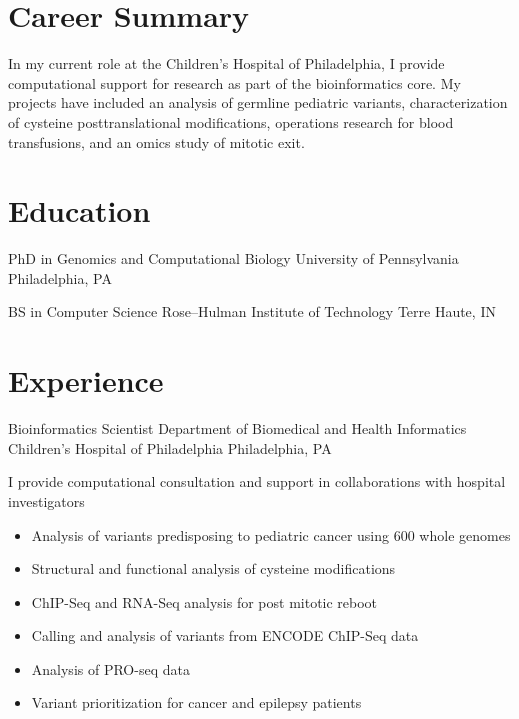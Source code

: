 \documentclass [10pt, letterpaper]{moderncv}
\newcommand\myitem{\item[ $\circ$ ]\hspace*{.1em} }
\begin{document}
\maketitle


\section {Career Summary}
\cvline {} {In my current role at the Children's Hospital of Philadelphia, I provide computational support for research as part of the bioinformatics core. My projects have included an analysis of germline pediatric variants, characterization of cysteine posttranslational modifications, operations research for blood transfusions, and an omics study of mitotic exit.}

\section {Education}


         {PhD in Genomics and Computational Biology}
         {University of Pennsylvania}
         {Philadelphia, PA}
         {}
         {}

         {BS in Computer Science}
         {Rose--Hulman Institute of Technology}
         {Terre Haute, IN}
         {}
         {}

\section {Experience}

         {Bioinformatics Scientist}
         {Department of Biomedical and Health Informatics}
         {Children's Hospital of Philadelphia}
         {Philadelphia, PA}
         {I  provide computational consultation and support in collaborations with  hospital investigators
           \begin{itemize}%
             \setlength{\itemindent}{1.5em}
         \myitem Analysis of variants predisposing to pediatric cancer using 600 whole genomes
         \myitem Structural and functional analysis of cysteine modifications
         \myitem ChIP-Seq and RNA-Seq analysis for post mitotic reboot
         \myitem Calling and analysis of variants from ENCODE ChIP-Seq data
         \myitem Analysis of PRO-seq data
         \myitem Variant prioritization for cancer and epilepsy patients
           \end{itemize}
           }
\end{document}
